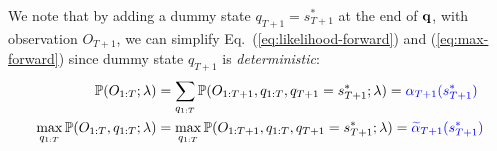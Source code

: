 We note that by adding a dummy state $q_{T+1} = s_{T+1}^*$ at the end of $\mathbf{q}$, with observation $O_{T+1}$, 
we can simplify Eq.~(\ref{eq:likelihood-forward}) and (\ref{eq:max-forward}) since dummy state $q_{T+1}$ is \emph{deterministic}:
\begin{align*}
\mathbb{P}(O_{1:T}; \lambda) 
&= \sum_{q_{1:T}} \mathbb{P}(O_{1:T+1}, q_{1:T}, q_{T+1} = s_{T+1}^*; \lambda)
 = {\color{blue}{\alpha_{T+1}(s_{T+1}^*)}} \\
\max_{q_{1:T}} \mathbb{P}(O_{1:T}, q_{1:T}; \lambda) 
&= \max_{q_{1:T}} \mathbb{P}(O_{1:T+1}, q_{1:T}, q_{T+1} = s_{T+1}^*; \lambda)
 = {\color{blue}{\widetilde{\alpha}_{T+1}(s_{T+1}^*)}}
\end{align*}
